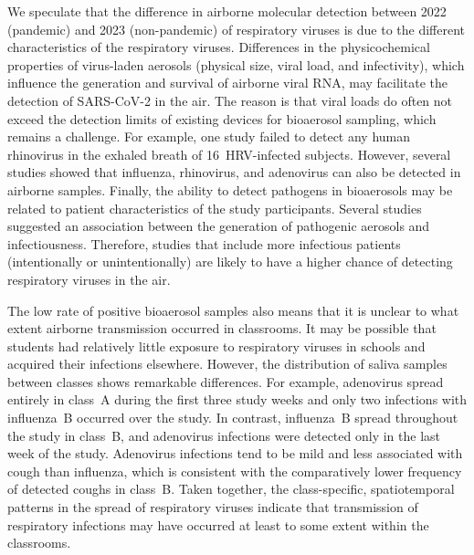 \documentclass[fleqn,11pt]{wlscirep}
\begin{document}
We speculate that the difference in airborne molecular detection between 2022 (pandemic) and 2023 (non-pandemic) of respiratory viruses is due to the different characteristics of the respiratory viruses. Differences in the physicochemical properties of virus-laden aerosols (\eg physical size, viral load, and infectivity), which influence the generation and survival of airborne viral RNA\cite{Wang2021,Sattar2016Book}, may facilitate the detection of SARS-CoV-2 in the air. The reason is that viral loads do often not exceed the detection limits of existing devices for bioaerosol sampling, which remains a challenge\cite{Wang2021,Belser2023PLOSPath,Bekking2019IORV,Mainelis2020AST}. For example, one study failed to detect any human rhinovirus in the exhaled breath of 16~HRV-infected subjects\cite{Fabian2011JAMPDD}. However, several studies showed that influenza\cite{Bischoff2013JID,Pan2017mSphere}, rhinovirus\cite{Myatt2004AJRCCM}, and adenovirus\cite{Nguyen2017OFID,Pan2017mSphere} can also be detected in airborne samples. Finally, the ability to detect pathogens in bioaerosols may be related to patient characteristics of the study participants. Several studies suggested an association between the generation of pathogenic aerosols and infectiousness\cite{Leung2020NatMed,Bischoff2013JID,Escombe2008PLoSMed}. Therefore, studies that include more infectious patients (intentionally or unintentionally) are likely to have a higher chance of detecting respiratory viruses in the air. 


The low rate of positive bioaerosol samples also means that it is unclear to what extent airborne transmission occurred in classrooms. It may be possible that students had relatively little exposure to respiratory viruses in schools and acquired their infections elsewhere. However, the distribution of saliva samples between classes shows remarkable differences. For example, adenovirus spread entirely in class~A during the first three study weeks and only two infections with influenza~B occurred over the study. In contrast, influenza~B spread throughout the study in class~B, and adenovirus infections were  detected only in the last week of the study. Adenovirus infections tend to be mild\cite{Kunz2010CIDR} and less associated with cough than influenza\cite{Ma2018RMV}, which is consistent with the comparatively lower frequency of detected coughs in class~B. Taken together, the class-specific, spatiotemporal patterns in the spread of respiratory viruses indicate that transmission of respiratory infections may have occurred at least to some extent within the classrooms. 
\end{document}
